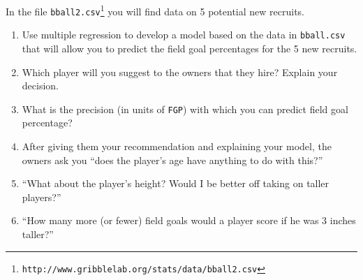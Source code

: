 \documentclass[10pt]{article}
\begin{document}
In the file \texttt{bball2.csv}\footnote{\texttt{http://www.gribblelab.org/stats/data/bball2.csv}} you will find data on 5 potential new recruits.

\begin{enumerate}

\item Use multiple regression to develop a model based on the data in
  \texttt{bball.csv} that will allow you to predict the field goal
  percentages for the 5 new recruits.

\item Which player will you suggest to the owners that they hire?
  Explain your decision.

\item What is the precision (in units of \texttt{FGP}) with which you
  can predict field goal percentage?

\item After giving them your recommendation and explaining your model,
  the owners ask you ``does the player's age have anything to do with
  this?''

\item ``What about the player's height? Would I be better off taking
  on taller players?''

\item ``How many more (or fewer) field goals would a player score if
  he was 3 inches taller?''

\end{enumerate}
\end{document}
